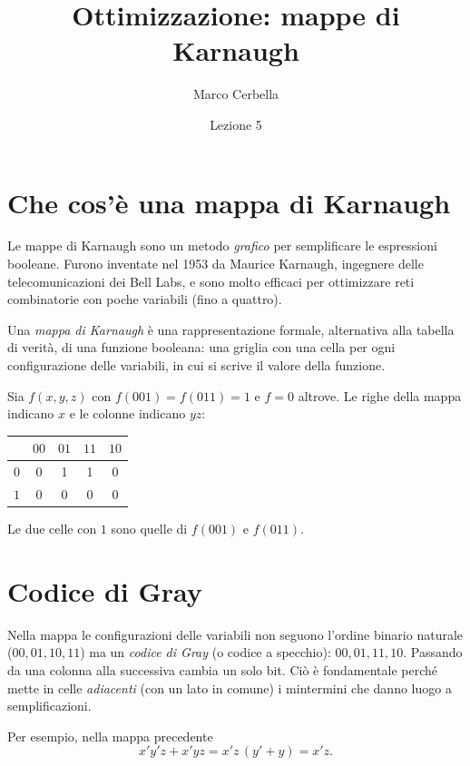 \documentclass[11pt,a4paper]{article}
\title{Ottimizzazione: mappe di Karnaugh}
\author{Marco Cerbella}
\date{Lezione 5}
\begin{document}
\maketitle

\section{Che cos'è una mappa di Karnaugh}

Le mappe di Karnaugh sono un metodo \emph{grafico} per semplificare le espressioni booleane. Furono inventate nel 1953 da Maurice Karnaugh, ingegnere delle telecomunicazioni dei Bell Labs, e sono molto efficaci per ottimizzare reti combinatorie con poche variabili (fino a quattro).

\begin{definizione}
Una \emph{mappa di Karnaugh} è una rappresentazione formale, alternativa alla tabella di verità, di una funzione booleana: una griglia con una cella per ogni configurazione delle variabili, in cui si scrive il valore della funzione.
\end{definizione}

\begin{esempio}
Sia $f(x,y,z)$ con $f(001) = f(011) = 1$ e $f = 0$ altrove. Le righe della mappa indicano $x$ e le colonne indicano $yz$:
\begin{center}
\begin{tabular}{c|cccc}
 & $00$ & $01$ & $11$ & $10$ \\
\midrule
$0$ & 0 & 1 & 1 & 0 \\
$1$ & 0 & 0 & 0 & 0 \\
\end{tabular}
\end{center}
Le due celle con $1$ sono quelle di $f(001)$ e $f(011)$.
\end{esempio}

\section{Codice di Gray}

Nella mappa le configurazioni delle variabili non seguono l'ordine binario naturale ($00, 01, 10, 11$) ma un \emph{codice di Gray} (o codice a specchio): $00, 01, 11, 10$. Passando da una colonna alla successiva cambia un solo bit. Ciò è fondamentale perché mette in celle \emph{adiacenti} (con un lato in comune) i mintermini che danno luogo a semplificazioni.

Per esempio, nella mappa precedente
\[
x'y'z + x'yz = x'z\,(y' + y) = x'z.
\]
\end{document}
